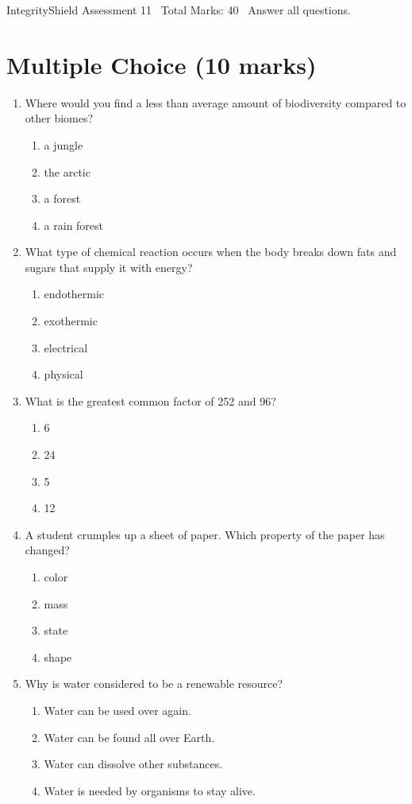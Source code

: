 \documentclass[12pt]{article}
\begin{document}
\begin{center}
IntegrityShield Assessment 11 \
Total Marks: 40 \
Answer all questions.
\end{center}

\section*{Multiple Choice (10 marks)}
\begin{enumerate}[label=\arabic*.]
\item Where would you find a less than average amount of biodiversity compared to other biomes?
\begin{enumerate}[label=(\alph*)]
    \item a jungle
    \item the arctic
    \item a forest
    \item a rain forest
\end{enumerate}
\item What type of chemical reaction occurs when the body breaks down fats and sugars that supply it with energy?
\begin{enumerate}[label=(\alph*)]
    \item endothermic
    \item exothermic
    \item electrical
    \item physical
\end{enumerate}
\item What is the greatest common factor of 252 and 96?
\begin{enumerate}[label=(\alph*)]
    \item 6
    \item 24
    \item 5
    \item 12
\end{enumerate}
\item A student crumples up a sheet of paper. Which property of the paper has changed?
\begin{enumerate}[label=(\alph*)]
    \item color
    \item mass
    \item state
    \item shape
\end{enumerate}
\item Why is water considered to be a renewable resource?
\begin{enumerate}[label=(\alph*)]
    \item Water can be used over again.
    \item Water can be found all over Earth.
    \item Water can dissolve other substances.
    \item Water is needed by organisms to stay alive.
\end{enumerate}
\end{enumerate}
\end{document}
